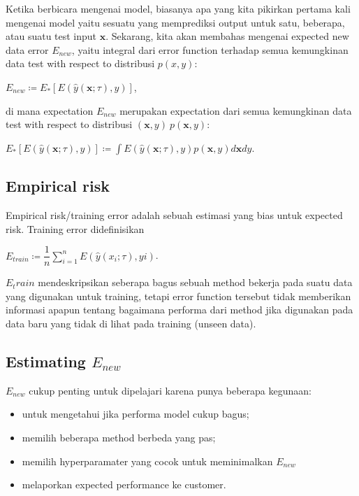 \documentclass{article}
\begin{document}
Ketika berbicara mengenai model, biasanya apa yang kita pikirkan pertama kali mengenai model yaitu sesuatu yang memprediksi output untuk satu, beberapa, atau suatu test input $\mathbf{x}$. Sekarang, kita akan membahas mengenai expected new data error $E_{new}$, yaitu integral dari error function terhadap semua kemungkinan data test with respect to distribusi $p(x,y)$: \newline

$E_{new} \coloneq E_*[E(\hat{y}(\mathbf{x};\tau),y)]$, \newline

di mana expectation $E_{new}$ merupakan expectation dari semua kemungkinan data test with respect to distribusi $(\mathbf{x},y) ~ p(\mathbf{x},y)$: \newline

$E_{*}[E(\hat{y}(\mathbf{x};\tau),y)] \coloneq \int E(\hat{y}(\mathbf{x};\tau),y) p(\mathbf{x},y) d\mathbf{x}dy$.

\subsection{Empirical risk}
Empirical risk/training error adalah sebuah estimasi yang bias untuk expected risk. Training error didefinisikan

$E_{train}\coloneq \dfrac{1}{n} \sum^{n}_{i=1} E( \hat{y}(x_i;\tau),yi) $.

$E_train$ mendeskripsikan seberapa bagus sebuah method bekerja pada suatu data yang digunakan untuk training, tetapi error function tersebut tidak memberikan informasi apapun tentang bagaimana performa dari method jika digunakan pada data baru yang tidak di lihat pada training (unseen data).


\subsection{Estimating $E_{new}$}

$E_{new}$ cukup penting untuk dipelajari karena punya beberapa kegunaan:
\begin{itemize}
  \item untuk mengetahui jika performa model cukup bagus;
  \item memilih beberapa method berbeda yang pas;
  \item memilih hyperparamater yang cocok untuk meminimalkan $E_{new}$
  \item melaporkan expected performance ke customer.
\end{itemize}
\end{document}
